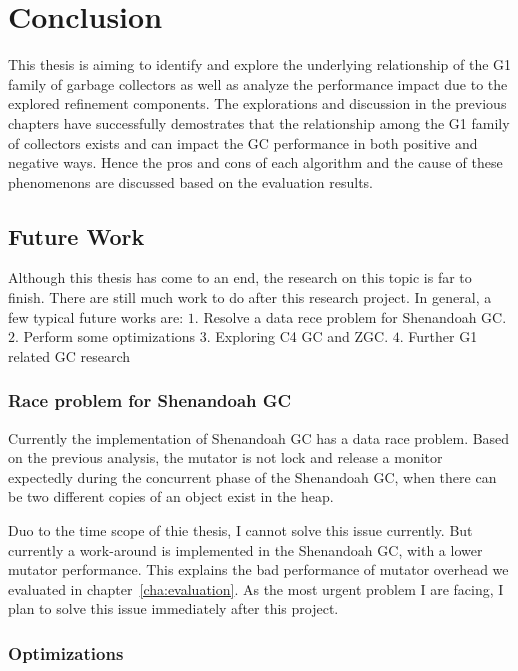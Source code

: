 \chapter{Conclusion}
\label{cha:conc}

This thesis is aiming to identify and explore the underlying relationship of the
G1 family of garbage collectors as well as analyze the performance impact due to
the explored refinement components.
The explorations and discussion in the previous chapters have successfully demostrates
that the relationship among the G1 family of collectors exists and can impact the GC
performance in both positive and negative ways.
Hence the pros and cons of each algorithm and the cause of these phenomenons
are discussed based on the evaluation results.

\section{Future Work}
\label{sec:future}

Although this thesis has come to an end, the research on this topic is far to finish.
There are still much work to do after this research project.
In general, a few typical future works are:
$1.$ Resolve a data rece problem for Shenandoah GC.
$2.$ Perform some optimizations
$3.$ Exploring C4 GC and ZGC.
$4.$ Further G1 related GC research

\subsection{Race problem for Shenandoah GC}

Currently the implementation of Shenandoah GC has a data race problem.
Based on the previous analysis, the mutator is not lock and release a monitor
expectedly during the concurrent phase of the Shenandoah GC, when there can be
two different copies of an object exist in the heap.

Duo to the time scope of thie thesis, I cannot solve this issue currently.
But currently a work-around is implemented in the Shenandoah GC, with a lower mutator performance.
This explains the bad performance of mutator overhead we evaluated in chapter~\ref{cha:evaluation}.
As the most urgent problem I are facing, I plan to solve this issue immediately after
this project.

\subsection{Optimizations}

